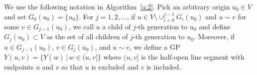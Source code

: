 \documentclass[alpha-refs]{wiley-article}
\begin{document}
%

We use the following notation in Algorithm~\ref{a:2}. Pick an arbitrary origin $u_0\in V$ and set $G_0(u_0)=\{u_0\}$. For $j=1,2,\ldots$, if $u\in V\setminus\cup_{i=0}^{j-1}G_i(u_0)$ and $u\sim v$ for some $v\in G_{j-1}(u_0)$, we call $u$ a child of $j$-th generation to $u_0$ and define $G_j(u_0)\subset V$ as the set of all children of $j$-th generation to $u_0$. 
Moreover, %
if $u\in G_{j-1}(u_0)$, $v\in G_j(u_0)$, and $u\sim v$, we define a GP $Y(u,v)=\{Y(w)\,|\,w\in(u,v]\}$ where $(u,v]$ is the half-open
line segment with endpoints $u$ and $v$ so that $u$ is excluded and $v$ is included. 
\end{document}

